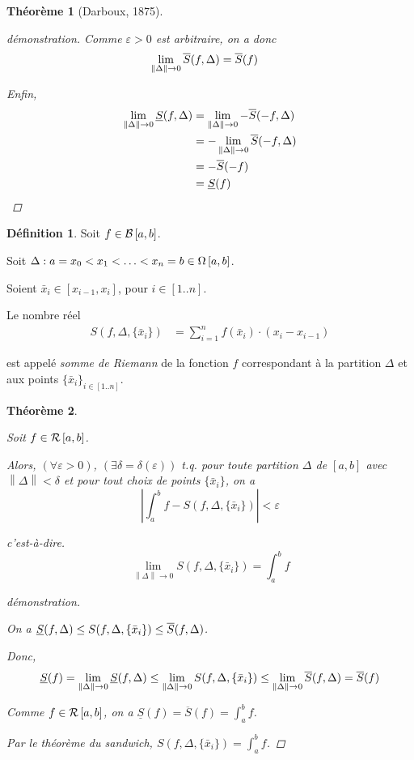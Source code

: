 \documentclass{report}
\newcommand*{\Ssup}[1]{\overline{S}(#1)}
\newcommand*{\Sinf}[1]{\underline{S}(#1)}
\newcommand*{\norme}[1]{\left\| #1 \right\|}
\newcommand*{\abs}[1]{\left| #1 \right|}
\newcommand*{\eps}{\varepsilon}
\newtheorem*{thm}{Th\'eor\`eme}
\theoremstyle{definition}
\newtheorem*{defin}{D\'efinition}
\theoremstyle{remark}
\begin{document}
\begin{thm}[Darboux, 1875]
\begin{proof}[d\'emonstration]
			Comme $\eps>0$ est arbitraire, on a donc
			\begin{align*}
				\lim\limits_{\norme{\Delta} \to 0}\ssup{f}&= \Ssup{f}
			\end{align*}

			Enfin,
			\begin{align*}
				\lim\limits_{\norme{\Delta} \to 0} \sinf{f}&= \lim\limits_{\norme{\Delta} \to 0} -\ssup{-f}\\
				&= -\lim\limits_{\norme{\Delta} \to 0} \ssup{-f}\\
				&= -\Ssup{-f}\\
				&= \Sinf{f}
			\end{align*}
		\end{proof}
	\end{thm}

	\begin{defin}


		Soit $f \in \bornee$.

		Soit $\Delta : a=x_0 < x_1 < \dotsc < x_n=b \in \partitions$.

		Soient $\bar{x}_i \in [x_{i-1},x_i]$, pour $i \in [1..n]$.

		Le nombre r\'eel
		\begin{align*}
			S(f,\Delta,\{\bar{x}_i\})&= \sum_{i=1}^{n}f(\bar{x}_i) \cdot (x_i-x_{i-1})
		\end{align*}

		est appel\'e \emph{somme de Riemann} de la fonction $f$ correspondant \`a la partition $\Delta$ et aux points $\{\bar{x}_i\}_{i \in [1..n]}$.
	\end{defin}

	\begin{thm}
		~

		Soit $f \in \riemann$.

		Alors, $(\forall\eps>0)$, $(\exists\delta=\delta(\eps))$ t.q. pour toute partition $\Delta$ de $[a,b]$ avec $\norme{\Delta}<\delta$ et pour tout choix de points $\{\bar{x}_i\}$, on a
		\[
		\abs{\int_{a}^{b}f - S(f, \Delta, \{\bar{x}_i\})} < \eps
		\]

		c'est-\`a-dire.
		\[
		\lim_{\norme{\Delta} \to 0}S(f, \Delta, \{\bar{x}_i\}) = \int_{a}^{b}f
		\]
		\begin{proof}[d\'emonstration]~

			On a $\sinf{f} \leq S(f, \Delta, \{\bar{x}_i\}) \leq \ssup{f}$.

			Donc,
			\[
			\Sinf{f} = \lim_{\norme{\Delta} \to 0}\sinf{f} \leq \lim_{\norme{\Delta} \to 0}S(f, \Delta, \{\bar{x}_i\}) \leq \lim_{\norme{\Delta} \to 0}\ssup{f} = \Ssup{f}
			\]

			Comme $f \in \riemann$, on a $\Sinf{f} = \Ssup{f} = \displaystyle\int_{a}^{b}f$.

			Par le th\'eor\`eme du sandwich, $S(f, \Delta, \{\bar{x}_i\}) = \displaystyle\int_a^bf$.
		\end{proof}
	\end{thm}
\end{document}
